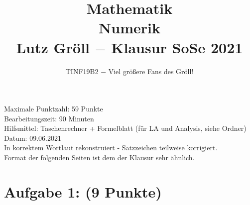 \documentclass[12pt]{article}
\title{Mathematik \rom{4} \\ Numerik \\ Lutz Gröll $-$ Klausur  SoSe 2021}
\author{TINF19B2 $-$ Viel größere Fans des Gröll!}
\begin{document}
\maketitle

\begin{center}
	\large
	\vspace*{8cm}
 	Maximale Punktzahl: 59 Punkte\\
	\vspace*{1cm}
	Bearbeitungszeit: 90 Minuten\\
	\vspace*{1cm}
	Hilfsmittel: Taschenrechner + Formelblatt (für LA und Analysis, siehe Ordner)\\
	\vspace*{1cm}
	Datum: 09.06.2021\\
	\vspace*{1cm}
	\small In korrektem Wortlaut rekonstruiert - Satzzeichen teilweise korrigiert.\\Format der folgenden Seiten ist dem der Klausur sehr ähnlich.\\
\end{center}
\pagebreak



\section*{Aufgabe 1: (9 Punkte)}
\end{document}
